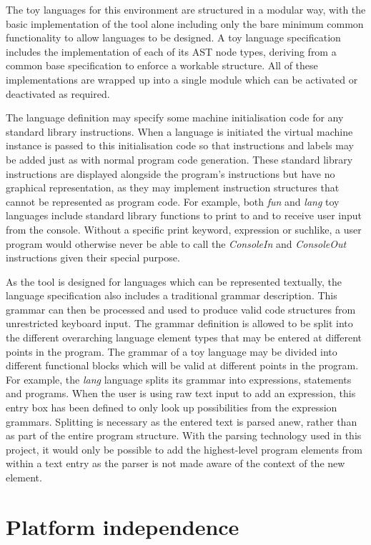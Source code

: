 The toy languages for this environment are structured in a modular way, with the basic implementation of the tool alone including only the bare minimum common functionality to allow languages to be designed. A toy language specification includes the implementation of each of its AST node types, deriving from a common base specification to enforce a workable structure. All of these implementations are wrapped up into a single module which can be activated or deactivated as required.

The language definition may specify some machine initialisation code for any standard library instructions. When a language is initiated the virtual machine instance is passed to this initialisation code so that instructions and labels may be added just as with normal program code generation. These standard library instructions are displayed alongside the program's instructions but have no graphical representation, as they may implement instruction structures that cannot be represented as program code. For example, both \textit{fun} and \textit{lang} toy languages include standard library functions to print to and to receive user input from the console. Without a specific print keyword, expression or suchlike, a user program would otherwise never be able to call the \textit{ConsoleIn} and \textit{ConsoleOut} instructions given their special purpose.

As the tool is designed for languages which can be represented textually, the language specification also includes a traditional grammar description. This grammar can then be processed and used to produce valid code structures from unrestricted keyboard input. The grammar definition is allowed to be split into the different overarching language element types that may be entered at different points in the program. The grammar of a toy language may be divided into different functional blocks which will be valid at different points in the program. For example, the \textit{lang} language splits its grammar into expressions, statements and programs. When the user is using raw text input to add an expression, this entry box has been defined to only look up possibilities from the expression grammars. Splitting is necessary as the entered text is parsed anew, rather than as part of the entire program structure. With the parsing technology used in this project, it would only be possible to add the highest-level program elements from within a text entry as the parser is not made aware of the context of the new element.

\section{Platform independence}

